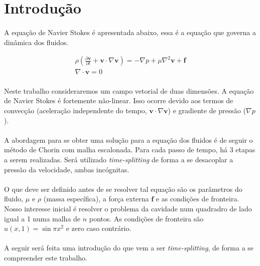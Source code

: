 \documentclass[introducao.tex]{subfiles}
\begin{document}
\section{Introdução}
\paragraph{} A equação de Navier Stokes é apresentada abaixo, essa é a equação que governa a dinâmica dos fluidos.

\begin{eqnarray}
\rho\left( \frac{\partial {\textbf{v}}}{\partial t}+\textbf{v}\cdot\nabla \textbf{v} \right)=-\nabla p+\mu\nabla^2 \textbf{v} + \textbf{f}\label{navierstokes}\\
\nabla\cdot\textbf{v}=0
\end{eqnarray}

\paragraph{} Neste trabalho consideraremos um campo vetorial de duas dimensões. A equação de Navier Stokes é fortemente não-linear. Isso ocorre devido aos termos de convecção (aceleração independente do tempo, $\textbf{v}\cdot \nabla\textbf{v}$) e gradiente de pressão ($\nabla p$). 

\paragraph{} A abordagem para se obter uma solução para a equação dos fluidos é de seguir o método de Chorin\cite{chorin68} com malha escalonada. Para cada passo de tempo, há 3 etapas a serem realizadas. Será utilizado \textit{time-splitting} de forma a se desacoplar a pressão da velocidade, ambas incógnitas. 

\paragraph{} O que deve ser definido antes de se resolver tal equação são os parâmetros do fluido, $\mu$ e $\rho$ (massa específica), a força externa $\textbf{f}$ e as condições de fronteira. Nosso interesse inicial é resolver o problema da cavidade num quadradro de lado igual a 1 numa malha de $n$ pontos. As condições de fronteira são $u(x,1)=\sin{\pi x}^2$ e zero caso contrário.
\paragraph{} A seguir será feita uma introdução do que vem a ser \textit{time-splitting}, de forma a se compreender este trabalho.
\end{document}
